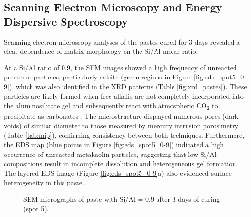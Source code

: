 \subsection{Scanning Electron Microscopy and Energy Dispersive Spectroscopy}

Scanning electron microscopy analyses of the pastes cured for 3 days revealed a clear dependence of matrix morphology on the Si/Al molar ratio.

At a Si/Al ratio of 0.9, the SEM images showed a high frequency of unreacted precursor particles, particularly calcite (green regions in Figure \ref{fig:eds_spot5_0-9}), which was also identified in the XRD patterns (Table \ref{fig:xrd_pastes}).
These particles are likely formed when free alkalis are not completely incorporated into the aluminosilicate gel and subsequently react with atmospheric CO\textsubscript{2} to precipitate as carbonates \cite{provis2018alkali}.
The microstructure displayed numerous pores (dark voids) of similar diameter to those measured by mercury intrusion porosimetry (Table \ref{tab:mip}), confirming consistency between both techniques.
Furthermore, the EDS map (blue points in Figure \ref{fig:eds_spot5_0-9}) indicated a high occurrence of unreacted metakaolin particles, suggesting that low Si/Al compositions result in incomplete dissolution and heterogeneous gel formation.
The layered EDS image (Figure \ref{fig:eds_spot5_0-9}a) also evidenced surface heterogeneity in this paste.

\begin{figure}[H]
  \centering
  \caption{SEM micrographs of paste with Si/Al = 0.9 after 3 days of curing (spot 5).}
  \label{fig:si_al_0-9_spot5}
\end{figure}

